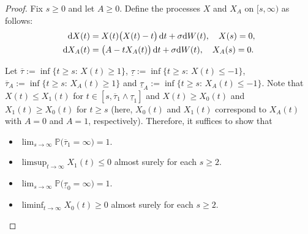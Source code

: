 \documentclass[sn-mathphys-num]{sn-jnl}
\theoremstyle{definition}
\newcommand{\scr}[1]{\mathscr #1}
\numberwithin{equation}{section} \theoremstyle{remark}
\renewcommand{\d}{\hbox{d}}
\def\d{\text{\rm{d}}} \def\bb{\beta} \def\aa{\alpha} \def\D{\scr D}
\def\P{\mathbb P}
\newcommand{\1}{\mathbbm{1}}
\renewcommand{\bar}{\overline}
\begin{document}
\begin{proof} Fix $s \geq 0$ and let $A\geq 0$. Define the processes $X$  and $X_A$ on $[s,\infty)$ as follows:
  \begin{align*}
\d X(t)&=X(t)\big(X(t)-t\big)\,\d t +\sigma \d W(t), \quad X(s)=0,\\
\d X_A(t)&=\big(A-tX_A(t)\big)\,\d t +\sigma \d W(t),\quad X_A(s)=0.
\end{align*}

Let $\bar \tau:= \inf\big\{t \geq s:\, X(t)\geq 1\big\}$, $\underline \tau:= \inf\big\{t \geq s:\,X(t)\leq -1\big\}$,      $\bar \tau_A := \inf\big\{t \geq s:\, X_A(t)\geq 1\big\}$ and $\underline \tau_A:= \inf\big\{t \geq s:\,X_A(t)\leq -1\big\}$. Note that
$X(t)\leq  X_1(t)$ for $t \in [s, \bar \tau_1\wedge \underline \tau_1]$ and  $X(t)\geq  X_0(t)$ and $X_1(t)\geq X_0(t)$ for $t \geq s$ (here, $X_0(t)$ and $X_1(t)$ correspond to $X_A(t)$ with $A=0$ and $A=1$, respectively).   
Therefore, it suffices to show that
\begin{itemize}
\item [i)] $\lim_{s \to \infty}\P\big( \bar \tau_1 =\infty\big)=1$.
\item [ii)] $\limsup_{t \to \infty} X_1(t)\leq 0$ almost surely for each $s \geq 2$.
\item [iii)] $\lim_{s \to \infty}\P\big( \underline \tau_0 =\infty\big)=1$.
\item [iv)] $\liminf_{t \to \infty} X_0(t)\geq 0$ almost surely for each $s \geq 2$.
\end{itemize}


\end{proof}
\end{document}
